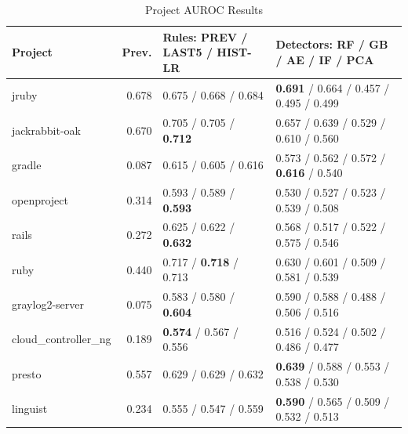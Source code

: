 \begin{table}[htbp]
\centering
\scriptsize\setlength{\tabcolsep}{2pt}
\caption{Project AUROC Results}
\label{tab:auroc}
\begin{tabular}{p{1.35cm}rp{2.15cm}p{3.05cm}}
\toprule
Project & Prev. & Rules: PREV / LAST5 / HIST-LR & Detectors: RF / GB / AE / IF / PCA \\
\midrule
jruby & 0.678 & 0.675 / 0.668 / 0.684 & \textbf{0.691} / 0.664 / 0.457 / 0.495 / 0.499 \\
jackrabbit-oak & 0.670 & 0.705 / 0.705 / \textbf{0.712} & 0.657 / 0.639 / 0.529 / 0.610 / 0.560 \\
gradle & 0.087 & 0.615 / 0.605 / 0.616 & 0.573 / 0.562 / 0.572 / \textbf{0.616} / 0.540 \\
openproject & 0.314 & 0.593 / 0.589 / \textbf{0.593} & 0.530 / 0.527 / 0.523 / 0.539 / 0.508 \\
rails & 0.272 & 0.625 / 0.622 / \textbf{0.632} & 0.568 / 0.517 / 0.522 / 0.575 / 0.546 \\
ruby & 0.440 & 0.717 / \textbf{0.718} / 0.713 & 0.630 / 0.601 / 0.509 / 0.581 / 0.539 \\
graylog2-server & 0.075 & 0.583 / 0.580 / \textbf{0.604} & 0.590 / 0.588 / 0.488 / 0.506 / 0.516 \\
cloud\allowbreak\_controller\allowbreak\_ng & 0.189 & \textbf{0.574} / 0.567 / 0.556 & 0.516 / 0.524 / 0.502 / 0.486 / 0.477 \\
presto & 0.557 & 0.629 / 0.629 / 0.632 & \textbf{0.639} / 0.588 / 0.553 / 0.538 / 0.530 \\
linguist & 0.234 & 0.555 / 0.547 / 0.559 & \textbf{0.590} / 0.565 / 0.509 / 0.532 / 0.513 \\
\bottomrule
\end{tabular}
\end{table}

